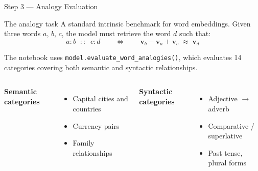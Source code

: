 \documentclass[11pt,aspectratio=169,professionalfonts]{beamer}
\begin{document}
%
%
\begin{frame}{Step 3 — Analogy Evaluation}
\small
\begin{block}{The analogy task}
  A standard intrinsic benchmark for word embeddings. Given three words
  $a$, $b$, $c$, the model must retrieve the word $d$ such that:
  \[
    a : b \;\;::\;\; c : d
    \qquad \Longleftrightarrow \qquad
    \mathbf{v}_b - \mathbf{v}_a + \mathbf{v}_c
    \;\approx\; \mathbf{v}_d
  \]
\end{block}

The notebook uses \texttt{model.evaluate\_word\_analogies()}, which
evaluates 14 categories covering both semantic and syntactic relationships.

\medskip
\begin{columns}[T]
\textbf{Semantic categories}
\begin{itemize}
  \item Capital cities and countries
  \item Currency pairs
  \item Family relationships
\end{itemize}

\textbf{Syntactic categories}
\begin{itemize}
  \item Adjective $\to$ adverb
  \item Comparative / superlative
  \item Past tense, plural forms
\end{itemize}
\end{columns}

\end{frame}
%
%
\end{document}
